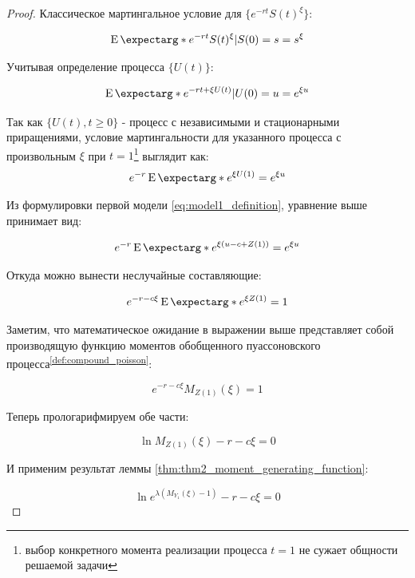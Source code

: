 \documentclass[a4paper,12pt]{article}
\theoremstyle{definition}
\newcommand{\expect}{\operatorname{E}\expectarg}
\begin{document}
\begin{proof}
Классическое мартингальное условие для $\{e^{-rt} S(t)^{\xi}\}$:

\begin{equation*}
\expect*{e^{-rt} S(t)^{\xi}|S(0) = s} = s^{\xi}
\end{equation*}

Учитывая определение процесса $\{U(t)\}$:

\begin{equation*}
\expect*{e^{-rt + \xi U(t)}|U(0) = u} = e^{\xi u}
\end{equation*}

Так как $\{U(t), t \ge 0\}$ - процесс с независимыми и стационарными приращениями, условие мартингальности для указанного процесса с произвольным $\xi$ при $t = 1$\footnote{выбор конкретного момента реализации процесса $t=1$ не сужает общности решаемой задачи} выглядит как:
\begin{equation*}\label{eq:thm2_eq1}
e^{-r}\expect*{e^{\xi U(1)}} = e^{\xi u}
\end{equation*}

Из формулировки первой модели \eqref{eq:model1_definition}, уравнение выше принимает вид:

\begin{equation*}
e^{-r}\expect*{e^{\xi(u - c + Z(1))}} = e^{\xi u}
\end{equation*}

Откуда можно вынести неслучайные составляющие:

\begin{equation*}
e^{-r - c \xi} \expect*{e^{\xi Z(1)}} = 1
\end{equation*}

Заметим, что математическое ожидание в выражении выше представляет собой производящую функцию моментов обобщенного пуассоновского процесса\textsuperscript{{\ref{def:compound_poisson}}}:

\begin{equation*}
e^{-r - c \xi} M_{Z(1)}(\xi) = 1
\end{equation*}

Теперь прологарифмируем обе части:

\begin{equation*}
\ln{M_{Z(1)}(\xi)} - r - c\xi = 0
\end{equation*}

И применим результат леммы \ref{thm:thm2_moment_generating_function}:

\begin{equation*}
\ln{e^{\lambda (M_{Y_1}(\xi) - 1)}} - r - c\xi = 0
\end{equation*}


\end{proof}
\end{document}

